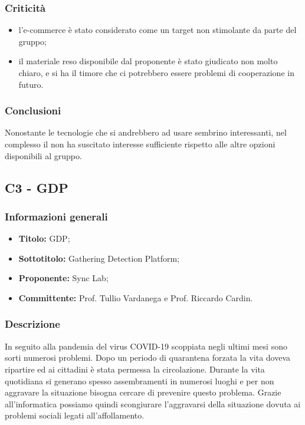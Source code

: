 \documentclass[]{article}
\begin{document}
			\subsubsection{Criticità}
			\begin{itemize}
			    \item l'e-commerce è stato considerato come un target non stimolante da parte del gruppo;
				\item il materiale reso disponibile dal proponente è stato giudicato non molto chiaro, e si ha il timore che ci potrebbero essere problemi di cooperazione in futuro.
			\end{itemize}

			\subsubsection{Conclusioni}
			Nonostante le tecnologie che si andrebbero ad usare sembrino interessanti, nel complesso il  non ha suscitato interesse sufficiente rispetto alle altre opzioni disponibili al gruppo.
		
		\newpage
		
		\subsection{C3 - GDP}
		\subsubsection{Informazioni generali}
		\begin{itemize}
			\item \textbf{Titolo:} GDP;
			\item \textbf{Sottotitolo:} Gathering Detection Platform;
			\item \textbf{Proponente:} Sync Lab;
			\item \textbf{Committente:} Prof. Tullio Vardanega e Prof. Riccardo Cardin.
		\end{itemize}
		
		\subsubsection{Descrizione}
		In seguito alla pandemia del virus COVID-19 scoppiata negli ultimi mesi sono sorti numerosi problemi. Dopo un periodo di quarantena forzata la vita doveva ripartire ed ai cittadini è stata permessa la circolazione. Durante la vita quotidiana si generano spesso assembramenti in numerosi luoghi e per non aggravare la situazione bisogna cercare di prevenire questo problema. Grazie all’informatica possiamo quindi scongiurare l’aggravarsi della situazione dovuta ai problemi sociali legati all’affollamento.
		
\end{document}
